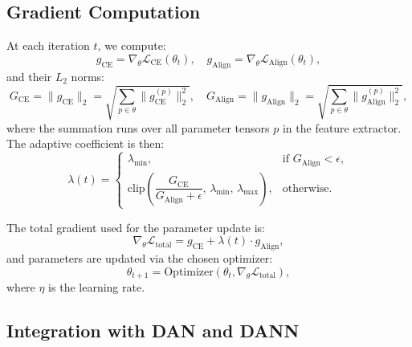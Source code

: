 \documentclass[pdflatex,sn-mathphys-num]{sn-jnl}
\theoremstyle{thmstyleone}
\theoremstyle{thmstyletwo}
\theoremstyle{thmstylethree}
\begin{document}
\subsection{Gradient Computation}

At each iteration $t$, we compute:
\begin{equation}
g_{\text{CE}} = \nabla_\theta \mathcal{L}_{\text{CE}}(\theta_t), \quad g_{\text{Align}} = \nabla_\theta \mathcal{L}_{\text{Align}}(\theta_t),
\label{eq:gradients}
\end{equation}
and their $L_2$ norms:
\begin{equation}
G_{\text{CE}} = \|g_{\text{CE}}\|_2 = \sqrt{\sum_{p \in \theta} \|g_{\text{CE}}^{(p)}\|_2^2}, \quad
G_{\text{Align}} = \|g_{\text{Align}}\|_2 = \sqrt{\sum_{p \in \theta} \|g_{\text{Align}}^{(p)}\|_2^2},
\label{eq:gradient_norms}
\end{equation}
where the summation runs over all parameter tensors $p$ in the feature extractor. The adaptive coefficient is then:
\begin{equation}
\lambda(t) =
\begin{cases}
\lambda_{\min}, & \text{if } G_{\text{Align}} < \epsilon, \\[4pt]
\mathrm{clip}\!\left(\dfrac{G_{\text{CE}}}{G_{\text{Align}} + \epsilon},\, \lambda_{\min},\, \lambda_{\max}\right), & \text{otherwise}.
\end{cases}
\label{eq:lambda_computation}
\end{equation}

The total gradient used for the parameter update is:
\begin{equation}
\nabla_\theta \mathcal{L}_{\text{total}} = g_{\text{CE}} + \lambda(t) \cdot g_{\text{Align}},
\label{eq:total_gradient}
\end{equation}
and parameters are updated via the chosen optimizer:
\begin{equation}
\theta_{t+1} = \text{Optimizer}\!\left(\theta_t, \nabla_\theta \mathcal{L}_{\text{total}}\right),
\label{eq:parameter_update}
\end{equation}
where $\eta$ is the learning rate.

\subsection{Integration with DAN and DANN}
\end{document}
